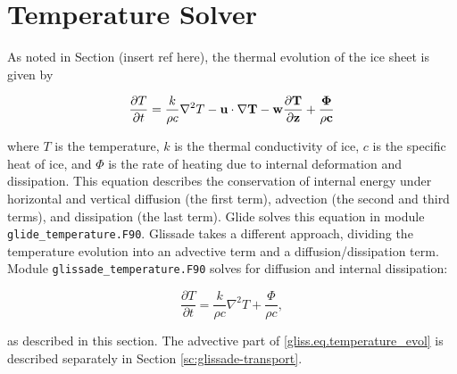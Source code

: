 
\section{Temperature Solver}
\label{sc:glissade-temperature}

As noted in Section (insert ref here), the thermal evolution of the ice sheet is given by

\begin{equation}
  \label{gliss.eq.temperature_evol}
  \frac{\partial T}{\partial t} = 
  \frac{k}{\rho c} {{\nabla }^{2}}T - \bf{u}\cdot \nabla T - w\frac{\partial T}{\partial z} + \frac{\Phi }{\rho c}
\end{equation}

\noindent
where $T$ is the temperature, $k$ is the thermal conductivity of ice, $c$ is the specific heat of ice,
and $\Phi$ is the rate of heating due to internal deformation and dissipation.
This equation describes the conservation of internal energy under horizontal and vertical 
diffusion (the first term), advection (the second and third terms), and dissipation
(the last term).
Glide solves this equation in module {\tt glide\_temperature.F90}.
Glissade takes a different approach, dividing the temperature evolution into an advective term
and a diffusion/dissipation term.
Module {\tt glissade\_temperature.F90} solves for diffusion and internal dissipation:

\begin{equation}
  \frac{\partial T}{\partial t} = \frac{k}{\rho c}{{\nabla }^{2}}T + \frac{\Phi }{\rho c},
\end{equation}

\noindent
as described in this section.
The advective part of \eqref{gliss.eq.temperature_evol} is described separately
in Section \ref{sc:glissade-transport}.
